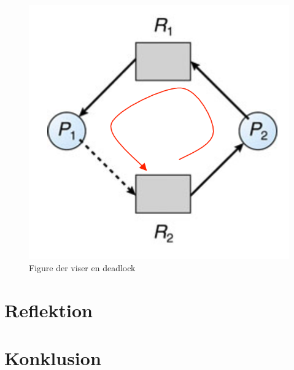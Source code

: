 \documentclass[danish]{report}
\begin{document}
\begin{figure}[H]
\begin{center}
\includegraphics[scale=0.4]{img/2.png}
\caption{Figure der viser en deadlock}
\label{fig:2}
\end{center}
\end{figure}


\chapter{Reflektion}
\chapter{Konklusion}
\end{document}
